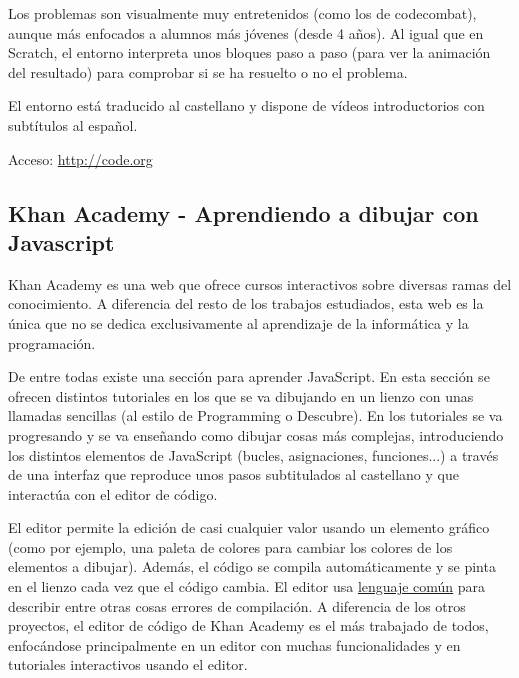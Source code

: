 \documentclass{report}
\begin{document}
	\vspace{10px}

	Los problemas son visualmente muy entretenidos (como los de codecombat), aunque más enfocados a alumnos más jóvenes (desde 4 años). Al igual que en Scratch, el entorno interpreta unos bloques paso a paso (para ver la animación del resultado) para comprobar si se ha resuelto o no el problema. 
	
	\vspace{10px}
	
	El entorno está traducido al castellano y dispone de vídeos introductorios con subtítulos al español.
	
	\vspace{10px}
	
	Acceso: \url{http://code.org}
	
	\subsection{Khan Academy - Aprendiendo a dibujar con Javascript}
	
	Khan Academy es una web que ofrece cursos interactivos sobre diversas ramas del conocimiento. A diferencia del resto de los trabajos estudiados, esta web es la única que no se dedica exclusivamente al aprendizaje de la informática y la programación.
	
	De entre todas existe una sección para aprender JavaScript. En esta sección se ofrecen distintos tutoriales en los que se va dibujando en un lienzo con unas llamadas sencillas (al estilo de Programming o Descubre). En los tutoriales se va progresando y se va enseñando como dibujar cosas más complejas, introduciendo los distintos elementos de JavaScript (bucles, asignaciones, funciones...) a través de una interfaz que reproduce unos pasos subtitulados al castellano y que interactúa con el editor de código.
		
	\vspace{10px}
	
	El editor permite la edición de casi cualquier valor usando un elemento gráfico (como por ejemplo, una paleta de colores para cambiar los colores de los elementos a dibujar). Además, el código se compila automáticamente y se pinta en el lienzo cada vez que el código cambia. El editor usa \hyperref[app:d]{lenguaje común} para describir entre otras cosas errores de compilación. A diferencia de los otros proyectos, el editor de código de Khan Academy es el más trabajado de todos, enfocándose principalmente en un editor con muchas funcionalidades y en tutoriales interactivos usando el editor.
	
\end{document}
